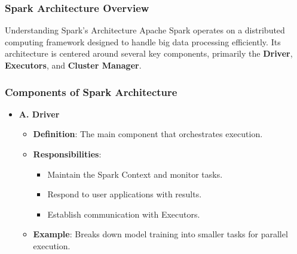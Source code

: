 \documentclass[aspectratio=169]{beamer}
\begin{document}
\begin{frame}[fragile]
    \frametitle{Spark Architecture Overview}
    \begin{block}{Understanding Spark's Architecture}
        Apache Spark operates on a distributed computing framework designed to handle big data processing efficiently. Its architecture is centered around several key components, primarily the \textbf{Driver}, \textbf{Executors}, and \textbf{Cluster Manager}.
    \end{block}
\end{frame}

\begin{frame}[fragile]
    \frametitle{Components of Spark Architecture}
    \begin{itemize}
        \item \textbf{A. Driver}
            \begin{itemize}
                \item \textbf{Definition}: The main component that orchestrates execution.
                \item \textbf{Responsibilities}:
                    \begin{itemize}
                        \item Maintain the Spark Context and monitor tasks.
                        \item Respond to user applications with results.
                        \item Establish communication with Executors.
                    \end{itemize}
                \item \textbf{Example}: Breaks down model training into smaller tasks for parallel execution.
            \end{itemize}
    \end{itemize}
\end{frame}
\end{document}
